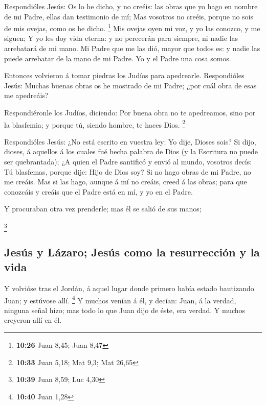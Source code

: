 Respondióles Jesús: Os lo he dicho, y no creéis: las
obras que yo hago en nombre de mi Padre, ellas dan testimonio de mí;
 Mas vosotros no creéis, porque no sois de mis ovejas,
como os he dicho. \footnote{\textbf{10:26} Juan 8,45; Juan 8,47}
 Mis ovejas oyen mi voz, y yo las conozco, y me siguen;
 Y yo les doy vida eterna: y no perecerán para siempre,
ni nadie las arrebatará de mi mano.  Mi Padre que me las
dió, mayor que todos es: y nadie las puede arrebatar de la mano de mi
Padre.  Yo y el Padre una cosa somos.

 Entonces volvieron á tomar piedras los Judíos para
apedrearle.  Respondióles Jesús: Muchas buenas obras os
he mostrado de mi Padre; ¿por cuál obra de esas me apedreáis?

 Respondiéronle los Judíos, diciendo: Por buena obra no
te apedreamos, sino por la blasfemia; y porque tú, siendo hombre, te
haces Dios. \footnote{\textbf{10:33} Juan 5,18; Mat 9,3; Mat 26,65}

 Respondióles Jesús: ¿No está escrito en vuestra ley: Yo
dije, Dioses sois?  Si dijo, dioses, á aquellos á los
cuales fué hecha palabra de Dios (y la Escritura no puede ser
quebrantada);  ¿A quien el Padre santificó y envió al
mundo, vosotros decís: Tú blasfemas, porque dije: Hijo de Dios soy?
 Si no hago obras de mi Padre, no me creáis.
 Mas si las hago, aunque á mí no creáis, creed á las
obras; para que conozcáis y creáis que el Padre está en mí, y yo en el
Padre.

 Y procuraban otra vez prenderle; mas él se salió de sus
manos;

\footnote{\textbf{10:39} Juan 8,59; Luc 4,30}

\hypertarget{jesuxfas-y-luxe1zaro-jesuxfas-como-la-resurrecciuxf3n-y-la-vida}{%
\subsection{Jesús y Lázaro; Jesús como la resurrección y la
vida}\label{jesuxfas-y-luxe1zaro-jesuxfas-como-la-resurrecciuxf3n-y-la-vida}}

 Y volvióse tras el Jordán, á aquel lugar donde primero
había estado bautizando Juan; y estúvose allí. \footnote{\textbf{10:40}
  Juan 1,28}  Y muchos venían á él, y decían: Juan, á la
verdad, ninguna señal hizo; mas todo lo que Juan dijo de éste, era
verdad.  Y muchos creyeron allí en él.

